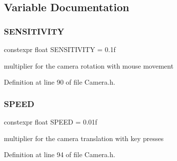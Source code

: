 \subsection{Variable Documentation}
\mbox{\label{_camera_8h_ab69e07c5be9d59da1c5eb1748d7bc913}} 
\subsubsection{SENSITIVITY}
{\footnotesize\ttfamily constexpr float S\+E\+N\+S\+I\+T\+I\+V\+I\+TY = 0.\+1f\hspace{0.3cm}{\ttfamily [constexpr]}}



multiplier for the camera rotation with mouse movement 



Definition at line 90 of file Camera.\+h.

\mbox{\label{_camera_8h_a8d5b6e83b6c863d1f668f488010651bd}} 
\subsubsection{SPEED}
{\footnotesize\ttfamily constexpr float S\+P\+E\+ED = 0.\+01f\hspace{0.3cm}{\ttfamily [constexpr]}}



multiplier for the camera translation with key presses 



Definition at line 94 of file Camera.\+h.

